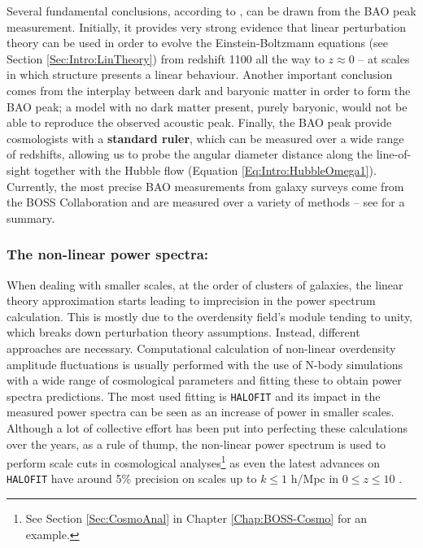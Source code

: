 \qquad Several fundamental conclusions, according to \cite{Einsenstein2005}, can be drawn from the BAO peak measurement. Initially, it provides very strong evidence that linear perturbation theory can be used in order to evolve the Einstein-Boltzmann equations (see Section \ref{Sec:Intro:LinTheory}) from redshift 1100 all the way to $z \approx 0$ -- at scales in which structure presents a linear behaviour. Another important conclusion comes from the interplay between dark and baryonic matter in order to form the BAO peak; a model with no dark matter present, purely baryonic, would not be able to reproduce the observed acoustic peak. Finally, the BAO peak provide cosmologists with a \textbf{standard ruler}, which can be measured over a wide range of redshifts, allowing us to probe the angular diameter distance along the line-of-sight together with the Hubble flow (Equation \ref{Eq:Intro:HubbleOmega1}). Currently, the most precise BAO measurements from galaxy surveys come from the BOSS Collaboration and are measured over a variety of methods -- see \citealt{2016BOSSCosmology} for a summary.

\subsubsection{The non-linear power spectra:}
When dealing with smaller scales, at the order of clusters of galaxies, the linear theory approximation starts leading to imprecision in the power spectrum calculation. This is mostly due to the overdensity field's module tending to unity, which breaks down perturbation theory assumptions. Instead, different approaches are necessary. Computational calculation of non-linear overdensity amplitude fluctuations is usually performed with the use of N-body simulations with a wide range of cosmological parameters and fitting these to obtain power spectra predictions. The most used fitting is \texttt{HALOFIT} \citep{2003HaloFit,2012-Halofit,Bird2012} and its impact in the measured power spectra can be seen as an increase of power in smaller scales. Although a lot of collective effort has been put into perfecting these calculations over the years, as a rule of thump, the non-linear power spectrum is used to perform scale cuts in cosmological analyses\footnote{See Section \ref{Sec:CosmoAnal} in Chapter \ref{Chap:BOSS-Cosmo} for an example.} as even the latest advances on \texttt{HALOFIT} have around 5\% precision on scales up to $k\leq 1$ h/Mpc in $0\leq z \leq 10$ \citep{2012-Halofit,Bird2012}. 

